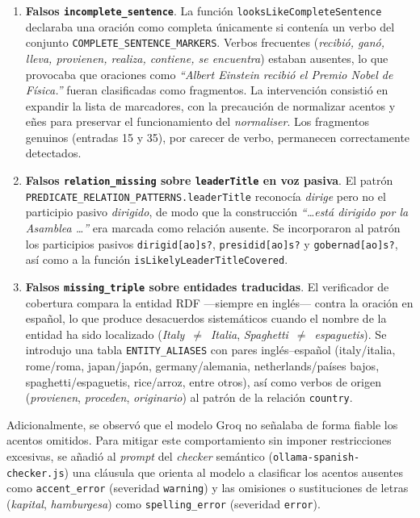 \begin{enumerate}
	\item \textbf{Falsos \texttt{incomplete\_sentence}}. La función
	      \texttt{looksLikeCompleteSentence} declaraba una oración como completa
	      únicamente si contenía un verbo del conjunto
	      \texttt{COMPLETE\_SEN\-TEN\-CE\_MAR\-KERS}. Verbos frecuentes (\textit{recibió,
		      ganó, lleva, provienen, realiza, contiene, se encuentra}) estaban ausentes, lo
	      que provocaba que oraciones como \textit{``Albert Einstein recibió el Premio
		      Nobel de Física.''} fueran clasificadas como fragmentos. La intervención
	      consistió en expandir la lista de marcadores, con la precaución de normalizar
	      acentos y eñes para preservar el funcionamiento del \textit{normaliser}. Los
	      fragmentos genuinos (entradas 15 y 35), por carecer de verbo, permanecen
	      correctamente detectados.

	\item \textbf{Falsos \texttt{relation\_missing} sobre \texttt{leaderTitle} en voz
		      pasiva}. El patrón \texttt{PREDICATE\_RELATION\_PATTERNS.leaderTitle} reconocía
	      \textit{dirige} pero no el participio pasivo \textit{dirigido}, de modo que la
	      construcción \textit{``\dots está dirigido por la Asamblea \dots''} era marcada
	      como relación ausente. Se incorporaron al patrón los participios pasivos
	      \texttt{dirigid[ao]s?}, \texttt{presidid[ao]s?} y \texttt{gobernad[ao]s?}, así
	      como a la función \texttt{isLikelyLeaderTitleCovered}.

	\item \textbf{Falsos \texttt{missing\_triple} sobre entidades traducidas}. El
	      verificador de cobertura compara la entidad RDF ---siempre en inglés--- contra la
	      oración en español, lo que produce desacuerdos sistemáticos cuando el nombre de
	      la entidad ha sido localizado (\textit{Italy}~$\neq$~\textit{Italia},
	      \textit{Spaghetti}~$\neq$~\textit{espaguetis}). Se introdujo una tabla
	      \texttt{ENTITY\_ALIASES} con pares inglés--español (italy/italia, rome/roma,
	      japan/japón, germany/alemania, netherlands/países bajos, spaghetti/espaguetis,
	      rice/arroz, entre otros), así como verbos de origen (\textit{provienen},
	      \textit{proceden}, \textit{originario}) al patrón de la relación
	      \texttt{country}.
\end{enumerate}

Adicionalmente, se observó que el modelo Groq no señalaba de forma fiable los
acentos omitidos. Para mitigar este comportamiento sin imponer restricciones
excesivas, se añadió al \textit{prompt} del \textit{checker} semántico
(\texttt{ollama-spanish-checker.js}) una cláusula que orienta al modelo a
clasificar los acentos ausentes como \texttt{accent\_error} (severidad
\texttt{warning}) y las omisiones o sustituciones de letras (\textit{kapital},
\textit{hamburgesa}) como \texttt{spelling\_error} (severidad \texttt{error}).

